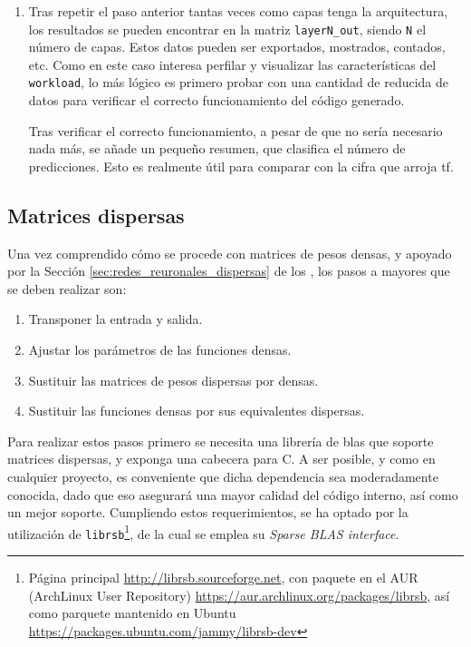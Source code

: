 \begin{enumerate}
    La implementación inicial de \texttt{map\_and\_bias} es similar a la siguiente:
\begin{lstlisting}[language=C]
void map_and_bias__fp32(fp32 *restrict A, const fp32 *restrict bias, const uint32_t M, const uint32_t N, fp32 (* map_function)(fp32 x)){
    for (uint32_t i = 0; i < M; i++){
        for(uint32_t j = 0; j < N; j++){
            A[i*N+j].val = map_function((fp32)(A[i*N+j].val +
                                        bias[j].val)).val;
        }
    }
}
\end{lstlisting}

    \item Tras repetir el paso anterior tantas veces como capas tenga la arquitectura, los resultados se pueden encontrar en la matriz \texttt{layerN\_out}, siendo \texttt{N} el número de capas. Estos datos pueden ser exportados, mostrados, contados, etc. Como en este caso interesa perfilar y visualizar las características del \texttt{workload}, lo más lógico es primero probar con una cantidad de reducida de datos para verificar el correcto funcionamiento del código generado.
    
    Tras verificar el correcto funcionamiento, a pesar de que no sería necesario nada más, se añade un pequeño resumen, que clasifica el número de predicciones. Esto es realmente útil para comparar con la cifra que arroja \acrshort{tf}.
\end{enumerate}


\subsection{Matrices dispersas}
\label{ssec_gdin_matrices_dispersas}
Una vez comprendido cómo se procede con matrices de pesos densas, y apoyado por la Sección \ref{sec:redes_reuronales_dispersas} de los , los pasos a mayores que se deben realizar son:

\begin{enumerate}
    \item Transponer la entrada y salida.
    \item Ajustar los parámetros de las funciones densas.
    \item Sustituir las matrices de pesos dispersas por densas.
    \item Sustituir las funciones densas por sus equivalentes dispersas.
\end{enumerate}

Para realizar estos pasos primero se necesita una librería de \acrshort{blas} que soporte matrices dispersas, y exponga una cabecera para C. A ser posible, y como en cualquier proyecto, es conveniente que dicha dependencia sea moderadamente conocida, dado que eso asegurará una mayor calidad del código interno, así como un mejor soporte. Cumpliendo estos requerimientos, se ha optado por la utilización de \texttt{librsb}\footnote{Página principal \url{http://librsb.sourceforge.net}, con paquete en el AUR (ArchLinux User Repository) \url{https://aur.archlinux.org/packages/librsb}, así como parquete mantenido en Ubuntu \url{https://packages.ubuntu.com/jammy/librsb-dev}}, de la cual se emplea su \textit{Sparse BLAS interface}.

